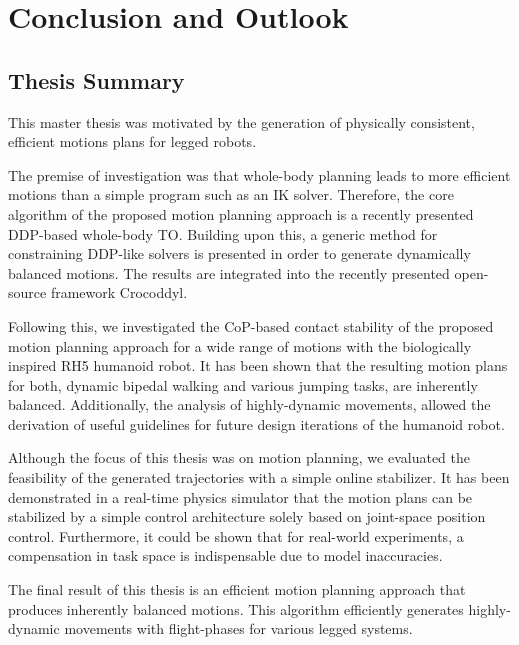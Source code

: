 
\chapter{Conclusion and Outlook}\label{c7}

\section{Thesis Summary}
This master thesis was motivated by the generation of physically consistent, efficient motions plans for legged robots. 

The premise of investigation was that whole-body planning leads to more efficient motions than a simple program such as an \gls{IK} solver. Therefore, the core algorithm of the proposed motion planning approach is a recently presented \gls{DDP}-based whole-body \gls{TO}. Building upon this, a generic method for constraining DDP-like solvers is presented in order to generate dynamically balanced motions. The results are integrated into the recently presented open-source framework Crocoddyl.

Following this, we investigated the \gls{CoP}-based contact stability of the  proposed motion planning approach for a wide range of motions with the biologically inspired RH5 humanoid robot. It has been shown that the resulting motion plans for both, dynamic bipedal walking and various jumping tasks, are inherently balanced. Additionally, the analysis of highly-dynamic movements, allowed the derivation of useful guidelines for future design iterations of the humanoid robot.

Although the focus of this thesis was on motion planning, we evaluated the feasibility of the generated trajectories with a simple online stabilizer. It has been demonstrated in a real-time physics simulator that the motion plans can be stabilized by a simple control architecture solely based on joint-space position control. Furthermore, it could be shown that for real-world experiments, a compensation in task space is indispensable due to model inaccuracies. 

The final result of this thesis is an efficient motion planning approach that produces inherently balanced motions. This algorithm efficiently generates highly-dynamic movements with flight-phases for various legged systems. 

